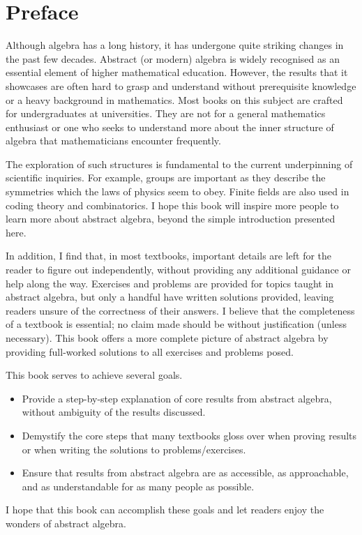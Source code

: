 \chapter{Preface}
Although algebra has a long history, it has undergone quite striking changes in the past few decades. Abstract (or modern) algebra is widely recognised as an essential element of higher mathematical education. However, the results that it showcases are often hard to grasp and understand without prerequisite knowledge or a heavy background in mathematics. Most books on this subject are crafted for undergraduates at universities. They are not for a general mathematics enthusiast or one who seeks to understand more about the inner structure of algebra that mathematicians encounter frequently.

The exploration of such structures is fundamental to the current underpinning of scientific inquiries. For example, groups are important as they describe the symmetries which the laws of physics seem to obey. Finite fields are also used in coding theory and combinatorics. I hope this book will inspire more people to learn more about abstract algebra, beyond the simple introduction presented here.

In addition, I find that, in most textbooks, important details are left for the reader to figure out independently, without providing any additional guidance or help along the way. Exercises and problems are provided for topics taught in abstract algebra, but only a handful have written solutions provided, leaving readers unsure of the correctness of their answers. I believe that the completeness of a textbook is essential; no claim made should be without justification (unless necessary). This book offers a more complete picture of abstract algebra by providing full-worked solutions to all exercises and problems posed.

This book serves to achieve several goals.
\begin{itemize}
    \item Provide a step-by-step explanation of core results from abstract algebra, without ambiguity of the results discussed.
    \item Demystify the core steps that many textbooks gloss over when proving results or when writing the solutions to problems/exercises.
    \item Ensure that results from abstract algebra are as accessible, as approachable, and as understandable for as many people as possible.
\end{itemize}
I hope that this book can accomplish these goals and let readers enjoy the wonders of abstract algebra.

